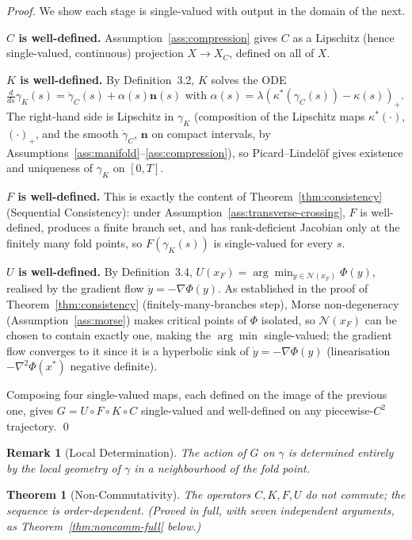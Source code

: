 \documentclass[14pt,a4paper]{extarticle}
\newtheorem{theorem}{Theorem}[section]
\newtheorem{remark}{Remark}[section]
\begin{document}
\begin{proof}
We show each stage is single-valued with output in the domain of the
next.

\textbf{$C$ is well-defined.} Assumption~\ref{ass:compression} gives
$C$ as a Lipschitz (hence single-valued, continuous) projection
$X\to X_C$, defined on all of $X$.

\textbf{$K$ is well-defined.} By Definition~3.2, $K$ solves the ODE
$\frac{d}{ds}\gamma_K(s) = \dot\gamma_C(s) + \alpha(s)\mathbf{n}(s)$
with $\alpha(s) = \lambda(\kappa^*(\gamma_C(s))-\kappa(s))_+$. The
right-hand side is Lipschitz in $\gamma_K$ (composition of the
Lipschitz maps $\kappa^*(\cdot)$, $(\cdot)_+$, and the smooth
$\dot\gamma_C$, $\mathbf{n}$ on compact intervals, by
Assumptions~\ref{ass:manifold}--\ref{ass:compression}), so
Picard--Lindel\"of gives existence and uniqueness of $\gamma_K$ on
$[0,T]$.

\textbf{$F$ is well-defined.} This is exactly the content of
Theorem~\ref{thm:consistency} (Sequential Consistency): under
Assumption~\ref{ass:transverse-crossing}, $F$ is well-defined, produces
a finite branch set, and has rank-deficient Jacobian only at the
finitely many fold points, so $F(\gamma_K(s))$ is single-valued for
every $s$.

\textbf{$U$ is well-defined.} By Definition~3.4, $U(x_F) =
\arg\min_{y\in\mathcal{N}(x_F)}\Phi(y)$, realised by the gradient flow
$\dot y=-\nabla\Phi(y)$. As established in the proof of
Theorem~\ref{thm:consistency} (finitely-many-branches step), Morse
non-degeneracy (Assumption~\ref{ass:morse}) makes critical points of
$\Phi$ isolated, so $\mathcal{N}(x_F)$ can be chosen to contain exactly
one, making the $\arg\min$ single-valued; the gradient flow converges
to it since it is a hyperbolic sink of $\dot y=-\nabla\Phi(y)$
(linearisation $-\nabla^2\Phi(x^*)$ negative definite).

Composing four single-valued maps, each defined on the image of the
previous one, gives $G=U\circ F\circ K\circ C$ single-valued and
well-defined on any piecewise-$C^2$ trajectory.
\qed
\end{proof}

\begin{remark}[Local Determination]
\label{thm:local}
The action of $G$ on $\gamma$ is determined entirely by the local
geometry of $\gamma$ in a neighbourhood of the fold point.
\end{remark}

\begin{theorem}[Non-Commutativity]
\label{thm:noncomm}
The operators $C, K, F, U$ do not commute; the sequence is
order-dependent. (Proved in full, with seven independent arguments, as
Theorem~\ref{thm:noncomm-full} below.)
\end{theorem}
\end{document}
